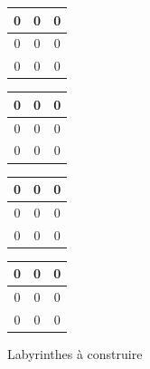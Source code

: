\documentclass[a4paper]{article}
\begin{document}
\begin{figure}[htbp]
  \centering
\begin{tabular}{|c|c|c|}
  \hline
  0 & 0 & 0 \\
  \hline
  0 & 0 & 0 \\
  \hline
  0 & 0 & 0 \\
  \hline
\end{tabular}
\hspace{0.5cm}
\begin{tabular}{|c|c|c|}
  \hline
  0 & 0 & 0 \\
  \hline
  0 & 0 & 0 \\
  \hline
  0 & 0 & 0 \\
  \hline
\end{tabular}

\vspace{0.5cm}

\begin{tabular}{|c|c|c|}
  \hline
  0 & 0 & 0 \\
  \hline
  0 & 0 & 0 \\
  \hline
  0 & 0 & 0 \\
  \hline
\end{tabular}
\hspace{0.5cm}
\begin{tabular}{|c|c|c|}
  \hline
  0 & 0 & 0 \\
  \hline
  0 & 0 & 0 \\
  \hline
  0 & 0 & 0 \\
  \hline
\end{tabular}
\caption{Labyrinthes à construire}\label{table:groslabs}
\end{figure}




\end{document}
